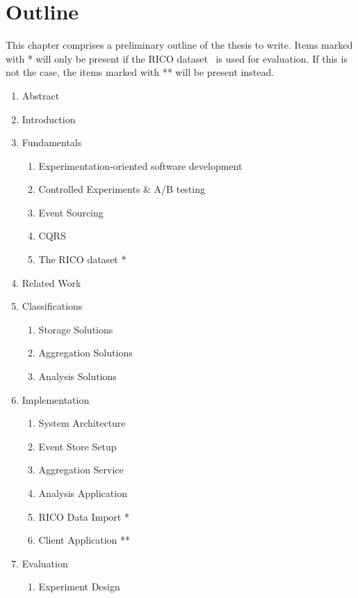%
\chapter{Outline}
\label{sec:outline}

This chapter comprises a preliminary outline of the thesis to write.
Items marked with * will only be present if the RICO dataset~\cite{Deka:2017:Rico} is used for evaluation.
If this is not the case, the items marked with ** will be present instead.

\begin{enumerate}[noitemsep,label=\arabic*.]
\item Abstract
\item Introduction
\item Fundamentals
	\begin{enumerate}[noitemsep,label=\arabic*.]
	\item Experimentation-oriented software development
	\item Controlled Experiments \& A/B testing
	\item Event Sourcing
	\item CQRS
	\item The RICO dataset *
	\end{enumerate}
\item Related Work
\item Classifications
	\begin{enumerate}[noitemsep,label=\arabic*.]
	\item Storage Solutions
	\item Aggregation Solutions
	\item Analysis Solutions
	\end{enumerate}
\item Implementation
	\begin{enumerate}[noitemsep,label=\arabic*.]
	\item System Architecture
	\item Event Store Setup
	\item Aggregation Service
	\item Analysis Application
	\item RICO Data Import *
	\item Client Application **
	\end{enumerate}
\item Evaluation
	\begin{enumerate}[noitemsep,label=\arabic*.]
	\item Experiment Design

\end{enumerate}
\end{enumerate}

